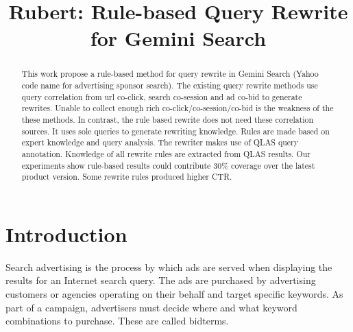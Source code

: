 \documentclass{sig-alternate}
\begin{document}
\sloppy
\newcommand{\para}[1]{\par \bigskip \noindent {\bf #1.}}
\newcommand{\spara}[1]{\par \bigskip \noindent {\sc #1.}}

\newcommand{\ymatrix}[1]{\mathbf{#1}}
\newcommand{\yvector}[1]{\mathbf{#1}}
\newcommand{\ytrans}[1]{#1^{\mathsf{T}}}

\newcommand{\yset}[1]{\mathcal{#1}}
\long{}
%

\title{Rubert: Rule-based Query Rewrite for Gemini Search}



\author{
}
\maketitle
\begin{abstract}
This work propose a rule-based method for query rewrite in Gemini Search (Yahoo code name for advertising sponsor search). The existing query rewrite methods use query correlation from  url co-click, search co-session and ad co-bid to generate rewrites. Unable to collect enough rich co-click/co-session/co-bid is the weakness of the these methods.  In contrast, the rule based rewrite does not need these correlation sources. It uses sole queries   to generate rewriting knowledge. Rules are made based on expert knowledge and query analysis. The rewriter makes use of QLAS query annotation.  Knowledge of  all rewrite rules are extracted from QLAS results. Our experiments show  rule-based results could contribute 30\% coverage over the latest product version. Some rewrite rules produced higher  CTR.


\end{abstract}



\section{Introduction}
Search advertising is the process by which ads are served when displaying the results for an Internet search query. The ads are purchased by advertising customers or agencies operating on their behalf and target specific keywords. As part of a campaign, advertisers must decide where and what keyword combinations to purchase. These are called bidterms. 
\end{document}
